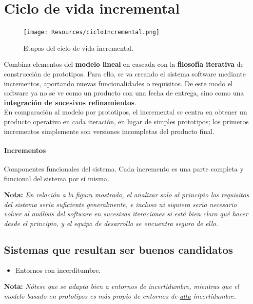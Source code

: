 \section{Ciclo de vida incremental}

\begin{figure}[H]
   \centering
   \texttt{[image: Resources/cicloIncremental.png]}
   \caption{Etapas del ciclo de vida incremental.}
   \label{fig:procesoIncremental}
\end{figure}

Combina elementos del \textbf{modelo lineal} en cascada con la \textbf{filosofía iterativa} de construcción de prototipos. Para ello, se va creando el sistema software mediante incrementos, aportando nuevas funcionalidades o requisitos. De este modo el software ya no se ve como un producto con una fecha de entrega, sino como una \textbf{integración de sucesivos refinamientos}.\\

En comparación al modelo por prototipos, el incremental se centra en obtener un producto operativo en cada iteración, en lugar de simples prototipos; los primeros incrementos simplemente son versiones incompletas del producto final.

\paragraph{Incrementos} Componentes funcionales del sistema. Cada incremento es una parte completa y funcional del sistema por sí misma.

\textbf{Nota:} \textit{En relación a la figura mostrada, el analizar solo al principio los requisitos del sistema sería suficiente generalmente, e incluso ni siquiera sería necesario volver al análisis del software en sucesivas iteraciones si está bien claro qué hacer desde el principio, y el equipo de desarrollo se encuentra seguro de ello.}

\subsection{Sistemas que resultan ser buenos candidatos}

\begin{itemize}
   \item Entornos con incerditumbre.
\end{itemize}

\textbf{Nota:} \textit{Nótese que se adapta bien a entornos de incertidumbre, mientras que el modelo basado en prototipos es más propio de entornos de \uline{alta} incertidumbre.}

